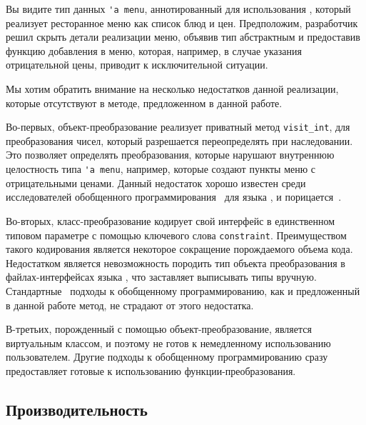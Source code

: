 \noindent Вы видите тип данных \lstinline{'a menu}, аннотированный для использования \visitors{}, который реализует ресторанное меню как список блюд и цен. Предположим, разработчик решил скрыть детали реализации меню, объявив тип абстрактным и предоставив функцию добавления в меню, которая, например, в случае указания отрицательной цены, приводит к исключительной ситуации.

Мы хотим обратить внимание на несколько недостатков данной реализации, которые отсутствуют в методе, предложенном в данной работе.

Во-первых, объект-преобразование реализует приватный метод \lstinline{visit_int}, для преобразования чисел, который разрешается переопределять при наследовании. Это позволяет определять преобразования, которые нарушают внутреннюю целостность типа \lstinline{'a menu}, например, которые создают пункты меню с отрицательными ценами. Данный недостаток хорошо известен среди исследователей обобщенного программирования~\cite{SYB} для языка \haskell{}, и порицается~\cite{SafeHaskell}.

Во-вторых, класс-преобразование кодирует свой интерфейс в единственном типовом параметре с помощью ключевого слова \lstinline{constraint}. Преимуществом такого кодирования является некоторое сокращение порождаемого объема кода. Недостатком является невозможность породить тип объекта преобразования в файлах-интерфейсах языка \OCaml{}, что заставляет выписывать типы вручную. Стандартные~\cite{ppxderiving} подходы к обобщенному программированию, как и предложенный в данной работе метод, не страдают от этого недостатка.

В-третьих, порожденный с помощью \visitors{} объект-преобразование, является виртуальным классом, и поэтому не готов к немедленному использованию пользователем. Другие подходы к обобщенному программированию сразу предоставляет готовые к использованию функции-преобразования.




\subsection{Производительность}
\label{sec:performance}

